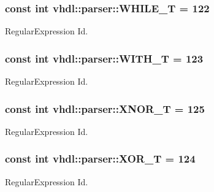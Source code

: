 \subsubsection[{W\+H\+I\+L\+E\+\_\+\+T}]{\setlength{\rightskip}{0pt plus 5cm}const int vhdl\+::parser\+::\+W\+H\+I\+L\+E\+\_\+\+T = 122}\label{namespacevhdl_1_1parser_aeb30c03b68b42cb68547d68949e3b4c3}
Regular\+Expression Id. \hypertarget{namespacevhdl_1_1parser_a0a0264f4055a4db5e51b97d422693639}{}
\subsubsection[{W\+I\+T\+H\+\_\+\+T}]{\setlength{\rightskip}{0pt plus 5cm}const int vhdl\+::parser\+::\+W\+I\+T\+H\+\_\+\+T = 123}\label{namespacevhdl_1_1parser_a0a0264f4055a4db5e51b97d422693639}
Regular\+Expression Id. \hypertarget{namespacevhdl_1_1parser_aec5829a9a55da912ca73b09e1d25d586}{}
\subsubsection[{X\+N\+O\+R\+\_\+\+T}]{\setlength{\rightskip}{0pt plus 5cm}const int vhdl\+::parser\+::\+X\+N\+O\+R\+\_\+\+T = 125}\label{namespacevhdl_1_1parser_aec5829a9a55da912ca73b09e1d25d586}
Regular\+Expression Id. \hypertarget{namespacevhdl_1_1parser_ac9163986559e85e15feb17bd99cf0f0a}{}
\subsubsection[{X\+O\+R\+\_\+\+T}]{\setlength{\rightskip}{0pt plus 5cm}const int vhdl\+::parser\+::\+X\+O\+R\+\_\+\+T = 124}\label{namespacevhdl_1_1parser_ac9163986559e85e15feb17bd99cf0f0a}
Regular\+Expression Id. 